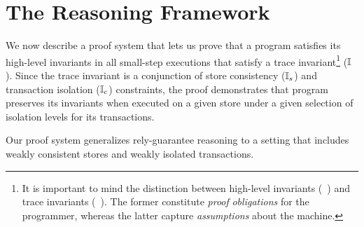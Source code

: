 \section{The Reasoning Framework}
\label{sec:reasoning}

We now describe a proof system that lets us prove that a \txnimp
program satisfies its high-level invariants in all small-step
executions that satisfy a trace invariant\footnote{It is important to
mind the distinction between high-level invariants (\eg~)
and trace invariants (\eg~). The former constitute \emph{proof}
\emph{obligations} for the programmer, whereas the latter capture
\emph{assumptions} about the machine. } ($\mathbb{I}$).  Since the trace
invariant is a conjunction of store consistency ($\mathbb{I}_s$) and
transaction isolation ($\mathbb{I}_c$) constraints, the proof demonstrates
that program preserves its invariants when executed on a given store
under a given selection of isolation levels for its transactions.


Our proof system generalizes rely-guarantee reasoning to a setting
that includes weakly consistent stores and weakly isolated
transactions. 


